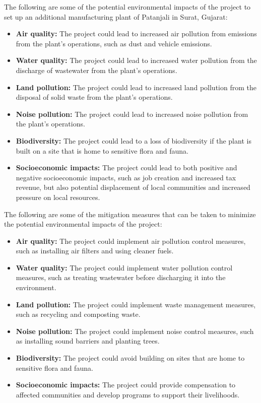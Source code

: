 The following are some of the potential environmental impacts of the project to set up an additional manufacturing plant of Patanjali in Surat, Gujarat:

\begin{itemize}
\item \textbf{Air quality:} The project could lead to increased air pollution from emissions from the plant's operations, such as dust and vehicle emissions.
\item \textbf{Water quality:} The project could lead to increased water pollution from the discharge of wastewater from the plant's operations.
\item \textbf{Land pollution:} The project could lead to increased land pollution from the disposal of solid waste from the plant's operations.
\item \textbf{Noise pollution:} The project could lead to increased noise pollution from the plant's operations.
\item \textbf{Biodiversity:} The project could lead to a loss of biodiversity if the plant is built on a site that is home to sensitive flora and fauna.
\item \textbf{Socioeconomic impacts:} The project could lead to both positive and negative socioeconomic impacts, such as job creation and increased tax revenue, but also potential displacement of local communities and increased pressure on local resources.
\end{itemize}

The following are some of the mitigation measures that can be taken to minimize the potential environmental impacts of the project:

\begin{itemize}
\item \textbf{Air quality:} The project could implement air pollution control measures, such as installing air filters and using cleaner fuels.
\item \textbf{Water quality:} The project could implement water pollution control measures, such as treating wastewater before discharging it into the environment.
\item \textbf{Land pollution:} The project could implement waste management measures, such as recycling and composting waste.
\item \textbf{Noise pollution:} The project could implement noise control measures, such as installing sound barriers and planting trees.
\item \textbf{Biodiversity:} The project could avoid building on sites that are home to sensitive flora and fauna.
\item \textbf{Socioeconomic impacts:} The project could provide compensation to affected communities and develop programs to support their livelihoods.
\end{itemize}

